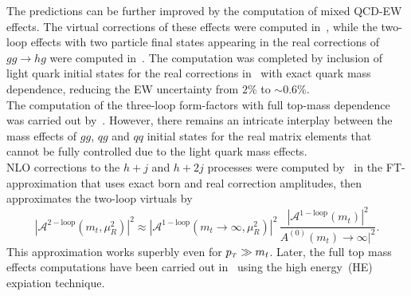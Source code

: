 The predictions can be further improved by the computation of mixed QCD-EW effects. The virtual corrections of these effects were computed in~\cite{Bonetti:2017ovy}, while the two-loop effects with two particle final states appearing in the real corrections of $ gg \to hg$  were computed in~\cite{Bonetti:2020hqh}. The computation was completed by inclusion of light quark initial states for the real corrections in~\cite{Becchetti:2020wof} with exact quark mass dependence, reducing the EW uncertainty from $2\%$ to $ \sim 0.6\%$.  \\ The computation of the three-loop form-factors with full top-mass dependence was carried out by~\cite{Czakon:2020vql,Czakon:2021yub}. However, there remains an intricate interplay between the mass effects of $gg$, $qg$ and $qq$ initial states for the real matrix elements that cannot be fully controlled due to the light quark mass effects. \\ NLO corrections to the $h +j$ and $ h+2j$ processes were computed by~\cite{Maltoni:2014eza} in the FT-approximation that uses exact born and real correction amplitudes, then approximates the two-loop virtuals by
\begin{equation}
	|	\mathcal A^{\mathrm{2-loop}}(m_t,\mu_R^2) |^2 \approx  |	\mathcal A^{\mathrm{1-loop}}(m_t\to \infty,\mu_R^2) |^2\, \frac{|	\mathcal A^{\mathrm{1-loop}}(m_t) |^2}{A^{\mathrm{(0)}}(m_t)\to \infty |^2}. 
\end{equation}
This approximation works superbly even for $ p_{\scriptscriptstyle T} \gg m_t$. Later, the full top mass effects computations have been carried out in~\cite{Kudashkin:2017skd, Lindert:2018iug} using the high energy~(HE) expiation technique. 
